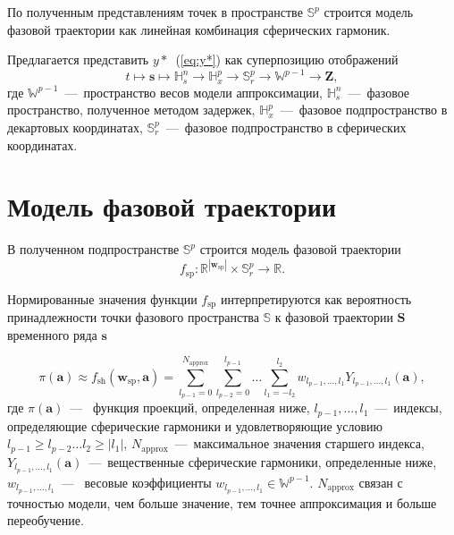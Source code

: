 \documentclass[article,14pt,subf,href,colorlinks=true
]{disser}
\begin{document}
По полученным представлениям точек в пространстве $\mathbb{S}^{p}$ строится модель фазовой траектории как линейная комбинация сферических гармоник.

Предлагается представить $y*$~(\ref{eq:y*}) как суперпозицию отображений
\begin{equation*}
t \mapsto \mathbf{s} \mapsto \mathbb{H}_{s}^{n} \xrightarrow{} \mathbb{H}_{x}^{p} \xrightarrow{} \mathbb{S}_r^{p} \xrightarrow{} \mathbb{W}^{p-1} \xrightarrow{} \mathbf{Z},
\label{tikhonov_eq_pipeline}
\end{equation*}
где $\mathbb{W}^{p-1}$~---~пространство весов модели аппроксимации, $\mathbb{H}_{s}^{n}$~---~фазовое пространство, полученное методом задержек, $\mathbb{H}_{x}^{p}$~---~фазовое подпространство в декартовых координатах, $\mathbb{S}_{r}^{p}$~---~фазовое подпространство в сферических координатах.
\newpage
\section{Модель фазовой траектории}
В полученном подпространстве $\mathbb{S}^{p}$ строится модель фазовой траектории
\begin{equation}
    f_{\text{sp}}: \mathbb{R}^{|\mathbf{w}_{\text{sp}}|} \times \mathbb{S}_{r}^{p}
    \xrightarrow{}
    \mathbb{R}.
\label{eq:f_sp}
\end{equation}

Нормированные значения функции $f_{\text{sp}}$ интерпретируются как вероятность принадлежности точки фазового пространства $\mathbb{S}$ к фазовой траектории $\mathbf{S}$ временного ряда $\mathbf{s}$

\begin{equation}
	\pi(\mathbf{a}) \approx
	f_{\text{sh}}(\mathbf{w}_{\text{sp}},\mathbf{a}) =
	\sum_{l_{p-1} = 0}^{N_{\text{approx}}}
	\sum_{l_{p-2} = 0}^{l_{p-1}}
	\dots
	\sum_{l_1 = -l_2}^{l_2}
	w_{l_{p-1},...,l_1} Y_{l_{p-1},...,l_1}(\mathbf{a}),
\label{eq:f_sh}
\end{equation}
где $\pi(\mathbf{a})$~---~ функция проекций, определенная ниже, $l_{p-1},...,l_1$~---~индексы, определяющие сферические гармоники и удовлетворяющие условию $l_{p-1} \geq l_{p-2} \dots l_2 \geq|l_1|$, $N_{\text{approx}}$~---~максимальное значения старшего индекса, $Y_{l_{p-1},...,l_1}(\mathbf{a})$~---~вещественные сферические гармоники, определенные ниже, $w_{l_{p-1},...,l_1}$~---~ весовые коэффициенты $w_{l_{p-1},...,l_1} \in \mathbb{W}^{p-1}$.
$N_{\text{approx}}$ связан с точностью модели, чем больше значение, тем точнее аппроксимация и больше переобучение. 
 
\end{document}
